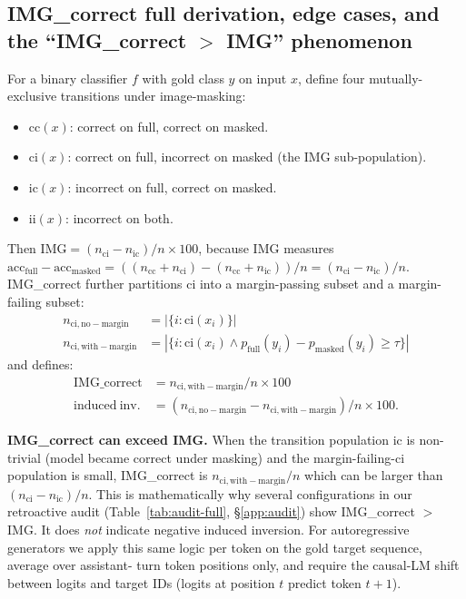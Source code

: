 \documentclass{article}
\begin{document}
\subsection{IMG\_correct full derivation, edge cases, and the
``IMG\_correct $>$ IMG'' phenomenon}
\label{app:imgcorrect}

For a binary classifier $f$ with gold class $y$ on input $x$, define four
mutually-exclusive transitions under image-masking:
\begin{itemize}\itemsep -2pt
\item $\mathrm{cc}(x)$: correct on full, correct on masked.
\item $\mathrm{ci}(x)$: correct on full, incorrect on masked (the IMG sub-population).
\item $\mathrm{ic}(x)$: incorrect on full, correct on masked.
\item $\mathrm{ii}(x)$: incorrect on both.
\end{itemize}
Then $\mathrm{IMG} = (n_{\mathrm{ci}} - n_{\mathrm{ic}})/n \times 100$,
because IMG measures $\mathrm{acc}_{\mathrm{full}} - \mathrm{acc}_{\mathrm{masked}}
= ((n_{\mathrm{cc}} + n_{\mathrm{ci}}) - (n_{\mathrm{cc}} + n_{\mathrm{ic}}))/n
= (n_{\mathrm{ci}} - n_{\mathrm{ic}})/n$. IMG\_correct further partitions
$\mathrm{ci}$ into a margin-passing subset and a margin-failing subset:
\begin{align}
n_{\mathrm{ci,no-margin}}      &= |\{i : \mathrm{ci}(x_i)\}|\\
n_{\mathrm{ci,with-margin}}    &= |\{i : \mathrm{ci}(x_i) \wedge p_{\mathrm{full}}(y_i) - p_{\mathrm{masked}}(y_i) \geq \tau\}|
\end{align}
and defines:
\begin{align}
\mathrm{IMG\_correct}    &= n_{\mathrm{ci,with-margin}}/n \times 100\\
\mathrm{induced\ inv.}   &= (n_{\mathrm{ci,no-margin}} - n_{\mathrm{ci,with-margin}})/n \times 100.
\end{align}

\textbf{IMG\_correct can exceed IMG.} When the transition population
$\mathrm{ic}$ is non-trivial (model became correct under masking) and the
margin-failing-$\mathrm{ci}$ population is small, IMG\_correct is
$n_{\mathrm{ci,with-margin}}/n$ which can be larger than
$(n_{\mathrm{ci}} - n_{\mathrm{ic}})/n$. This is mathematically why
several configurations in our retroactive audit (Table~\ref{tab:audit-full},
\S\ref{app:audit}) show IMG\_correct $>$ IMG. It does \emph{not} indicate
negative induced inversion. For autoregressive generators we apply this
same logic per token on the gold target sequence, average over assistant-
turn token positions only, and require the causal-LM shift between logits
and target IDs (logits at position $t$ predict token $t+1$).
\end{document}
